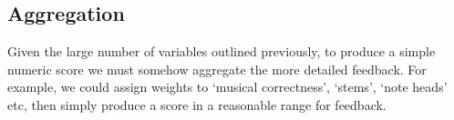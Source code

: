 \subsection{Aggregation}
Given the large number of variables outlined previously, to produce a simple numeric score we must somehow aggregate the more detailed feedback. For example, we could assign weights to `musical correctness', `stems', `note heads' etc, then simply produce a score in a reasonable range for feedback.

